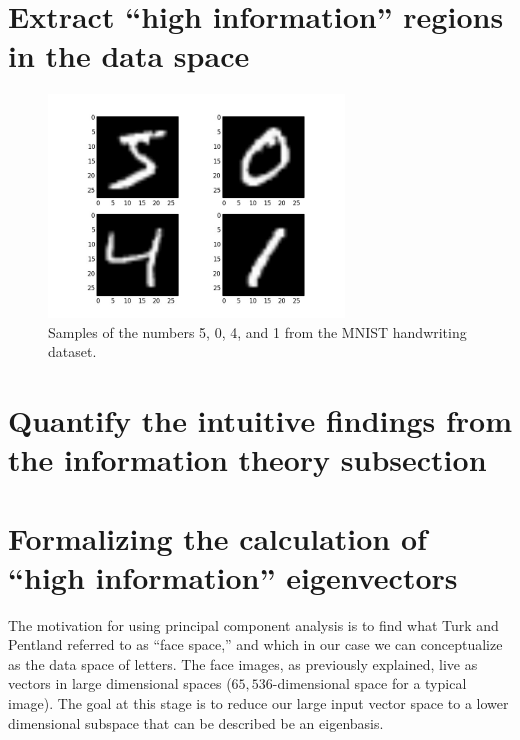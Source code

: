 \documentclass[12pt]{report}
\begin{document}
        \section{Extract ``high information'' regions in the data space}
            \begin{figure}[H]
                \centering
                \includegraphics[width=0.7\textwidth]{mnist-handwriting-dataset.jpg}
                \caption{\label{fig:mnist-handwriting-dataset} Samples of the numbers 5, 0, 4, and 1 from the MNIST handwriting dataset.}
            \end{figure}
        \section{Quantify the intuitive findings from the information theory subsection}
        
        \section{Formalizing the calculation of ``high information'' eigenvectors}
            The motivation for using principal component analysis is to find what Turk and Pentland referred to as ``face space,'' and which in our case we can conceptualize as the data space of letters. The face images, as previously explained, live as vectors in large dimensional spaces ($65,536$-dimensional  space for a typical image). The goal at this stage is to reduce our large input vector space to a lower dimensional subspace that can be described be an eigenbasis.  
    
\end{document}
